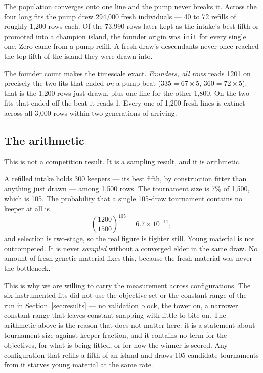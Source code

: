 \documentclass[11pt,a4paper]{article}
\begin{document}
The population converges onto one line and the pump never breaks it. Across the
four long fits the pump drew 294{,}000 fresh individuals --- 40 to 72 refills of
roughly 1{,}200 rows each. Of the 73{,}990 rows later kept as the intake's best
fifth or promoted into a champion island, the founder origin was \texttt{init}
for every single one. Zero came from a pump refill. A fresh draw's descendants
never once reached the top fifth of the island they were drawn into.

The founder count makes the timescale exact. \emph{Founders, all rows} reads
1201 on precisely the two fits that ended \emph{on} a pump beat ($335 = 67
\times 5$, $360 = 72 \times 5$): that is the 1{,}200 rows just drawn, plus one
line for the other 1{,}800. On the two fits that ended off the beat it reads 1.
Every one of 1{,}200 fresh lines is extinct across all 3{,}000 rows within two
generations of arriving.

\subsection{The arithmetic}

This is not a competition result. It is a sampling result, and it is arithmetic.

A refilled intake holds 300 keepers --- its best fifth, by construction fitter
than anything just drawn --- among 1{,}500 rows. The tournament size is 7\% of
1{,}500, which is 105. The probability that a single 105-draw tournament contains
no keeper at all is
\[
\left(\frac{1200}{1500}\right)^{105} = 6.7\times10^{-11},
\]
and selection is two-stage, so the real figure is tighter still. Young material
is not outcompeted. It is never \emph{sampled} without a converged elder in the
same draw. No amount of fresh genetic material fixes this, because the fresh
material was never the bottleneck.

This is why we are willing to carry the measurement across configurations. The
six instrumented fits did not use the objective set or the constant range of the
run in Section~\ref{sec:results} --- no validation block, the tower on, a
narrower constant range that leaves constant snapping with little to bite on.
The arithmetic above is the reason that does not matter here: it is a statement
about tournament size against keeper fraction, and it contains no term for the
objectives, for what is being fitted, or for how the winner is scored. Any
configuration that refills a fifth of an island and draws 105-candidate
tournaments from it starves young material at the same rate.
\end{document}

